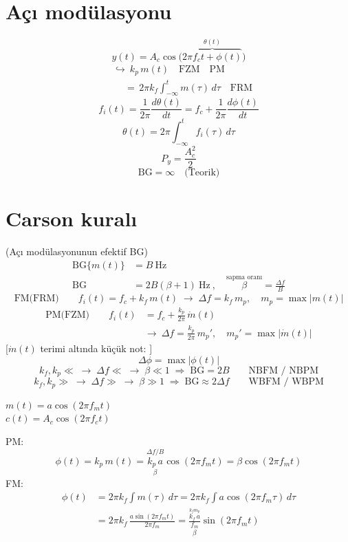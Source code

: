 \documentclass[11pt,a4paper]{article}
\begin{document}

\section{Açı modülasyonu}
\[ y(t)=A_c\cos\big(\overbrace{2\pi f_c t+\phi(t)}^{\theta(t)}\big) \]
\begin{align*}
&\hookrightarrow\ k_p\, m(t)\quad\text{FZM}\quad\text{PM}\\
&\quad\ {=}\,2\pi k_f\int_{-\infty}^{t} m(\tau)\,d\tau\quad\text{FRM}
\end{align*}
\[ f_i(t)=\frac{1}{2\pi}\frac{d\theta(t)}{dt}=f_c+\frac{1}{2\pi}\frac{d\phi(t)}{dt} \]
\[ \theta(t)=2\pi\int_{-\infty}^{t} f_i(\tau)\,d\tau \]
\[ P_y=\frac{A_c^2}{2} \]
\[ \mathrm{BG}=\infty\quad\text{(Teorik)} \]

\section{Carson kuralı}
(Açı modülasyonunun efektif BG)
\begin{align*}
\mathrm{BG}\{m(t)\}&=B\ \mathrm{Hz}\\
\mathrm{BG}&=2B(\beta+1)\ \mathrm{Hz}\ ,\quad \overset{\text{sapma oranı}}{\beta}=\frac{\Delta f}{B}
\end{align*}
\[ \text{FM(FRM)}\qquad f_i(t)=f_c+k_f\,m(t)\;\to\;\Delta f=k_f\,m_p,\quad m_p=\max|m(t)| \]
\begin{align*}
\text{PM(FZM)}\qquad f_i(t)&=f_c+\frac{k_p}{2\pi}\,\dot m(t)\\
&\to\ \Delta f=\frac{k_p}{2\pi}\,m_p',\quad m_p'=\max|\dot m(t)|
\end{align*}
[$\dot m(t)$ terimi altında küçük not: ]
\[ \Delta\phi=\max|\phi(t)| \]
\[ k_f,k_p\ll\;\to\;\Delta f\ll\;\to\;\beta\ll1\;\Rightarrow\;\mathrm{BG}=2B \qquad \text{NBFM / NBPM} \]
\[ k_f,k_p\gg\;\to\;\Delta f\gg\;\to\;\beta\gg1\;\Rightarrow\;\mathrm{BG}\approx2\Delta f \qquad \text{WBFM / WBPM} \]

\begin{ornek}
$m(t)=a\cos(2\pi f_m t)$\\
$c(t)=A_c\cos(2\pi f_c t)$
\end{ornek}
PM:
\[ \phi(t)=k_p\,m(t)=\overset{\Delta f/B}{\underset{\beta}{k_p\,a}}\cos(2\pi f_m t)=\beta\cos(2\pi f_m t) \]
FM:
\begin{align*}
\phi(t)&=2\pi k_f\int m(\tau)\,d\tau=2\pi k_f\int a\cos(2\pi f_m\tau)\,d\tau\\
&=2\pi k_f\,\frac{a\sin(2\pi f_m t)}{2\pi f_m}=\underset{\beta}{\frac{\overset{k_f m_p}{k_f\,a}}{f_m}}\sin(2\pi f_m t)
\end{align*}
\end{document}
